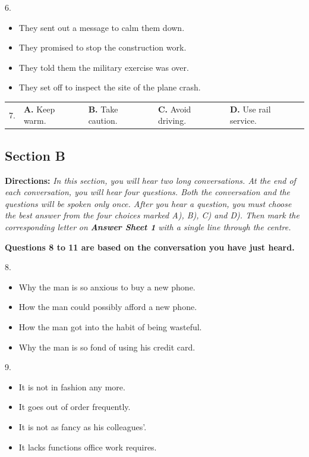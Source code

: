 \documentclass[UTF8,11pt]{ctexart}
\begin{document}
6.


\begin{itemize}[leftmargin=2em,itemsep=.2em,topsep=.4em]\item[A.] They sent out a message to calm them down.
\item[B.] They promised to stop the construction work.
\item[C.] They told them the military exercise was over.
\item[D.] They set off to inspect the site of the plane crash.
\end{itemize}

\noindent\begin{tabularx}{\linewidth}{@{}lXXXX@{}}7. & \textbf{A.} Keep warm. & \textbf{B.} Take caution. & \textbf{C.} Avoid driving. & \textbf{D.} Use rail service.\\\end{tabularx}\par

\subsection*{\textbf{Section B}}


\textbf{Directions:} \textit{In this section, you will hear two long conversations. At the end of each conversation, you will hear} \textit{four questions. Both the conversation and the questions will be spoken only once. After you hear a question, you} \textit{must choose the best answer from the four choices marked A), B), C) and D). Then mark the corresponding letter} \textit{on }\textbf{\textit{Answer Sheet 1}}\textit{ with a single line through the centre.}


\textbf{Questions 8 to 11 are based on the conversation you have just heard.}


8.


\begin{itemize}[leftmargin=2em,itemsep=.2em,topsep=.4em]\item[A.] Why the man is so anxious to buy a new phone.
\item[B.] How the man could possibly afford a new phone.
\item[C.] How the man got into the habit of being wasteful.
\item[D.] Why the man is so fond of using his credit card.
\end{itemize}

9.


\begin{itemize}[leftmargin=2em,itemsep=.2em,topsep=.4em]\item[A.] It is not in fashion any more.
\item[B.] It goes out of order frequently.
\item[C.] It is not as fancy as his colleagues’.
\item[D.] It lacks functions office work requires.
\end{itemize}
\end{document}
